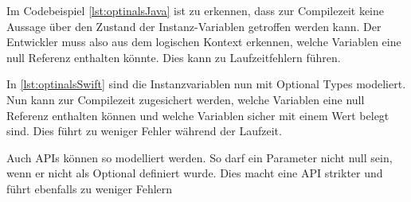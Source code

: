 Im Codebeispiel \ref{lst:optinalsJava} ist zu erkennen, dass zur Compilezeit keine Aussage über den Zustand der Instanz-Variablen getroffen werden kann. Der Entwickler muss also aus dem logischen Kontext erkennen, welche Variablen eine null Referenz enthalten könnte. Dies kann zu Laufzeitfehlern führen.


In \ref{lst:optinalsSwift} sind die Instanzvariablen nun mit Optional Types modeliert. Nun 
kann zur Compilezeit zugesichert werden, welche Variablen eine null Referenz enthalten können und welche Variablen sicher mit einem Wert belegt sind. Dies führt zu weniger Fehler während der Laufzeit.

Auch APIs können so modelliert werden. So darf ein Parameter nicht null sein, wenn er nicht als Optional definiert wurde. Dies macht eine API strikter und führt ebenfalls zu weniger Fehlern
